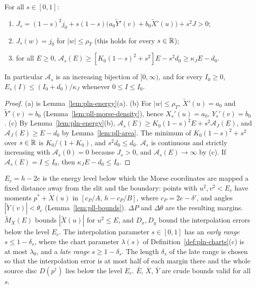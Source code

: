 \begin{lemma}\label{lem:pll-density-area}
For all $s\in[0,1]$:
\begin{enumerate}[label=(\alph*)]
\item $J_s=(1-s)^2j_0+s(1-s)\bigl(a_0\tilde Y'(v)+b_0\tilde X'(u)\bigr)+s^2J>0$;
\item $J_s(w)=j_0$ for $|w|\le\rho_T$ (this holds for every $s\in\mathbb{R}$);
\item for all $E\ge0$, $\mathcal A_s(E)\ge[K_0(1-s)^2+s^2]E-s^2d_0\ge\kappa_JE-d_0$.
\end{enumerate}
In particular $\mathcal A_s$ is an increasing bijection of $[0,\infty)$, and for every $I_0\ge0$,
$E_s(I)\le(I_0+d_0)/\kappa_J$ whenever $0\le I\le I_0$.
\end{lemma}

\begin{proof}
(a) is Lemma~\ref{lem:pln-energy}(a). (b) For $|w|\le\rho_T$, $\tilde X'(u)=a_0$ and $\tilde Y'(v)=b_0$
(Lemma~\ref{lem:pll-morse-density}), hence $X_s'(u)=a_0$, $Y_s'(v)=b_0$. (c) By Lemma~\ref{lem:pln-energy}(b),
$\mathcal A_s(E)\ge K_0(1-s)^2E+s^2\mathcal A_J(E)$, and $\mathcal A_J(E)\ge E-d_0$ by Lemma~\ref{lem:pll-area}. The
minimum of $K_0(1-s)^2+s^2$ over $s\in\mathbb{R}$ is $K_0/(1+K_0)$, and $s^2d_0\le d_0$. $\mathcal A_s$ is continuous and
strictly increasing with $\mathcal A_s(0)=0$ because $J_s>0$, and $\mathcal A_s(E)\to\infty$ by (c). If
$\mathcal A_s(E)=I\le I_0$, then $\kappa_JE-d_0\le I_0$.
\end{proof}

$E_c=h-2e$ is the energy level below which the Morse coordinates are mapped a fixed distance away from the slit and
the boundary: points with $u^2,v^2<E_c$ have moments $p^*+\tilde X(u)$ in $[c_P/A,\,h-c_P/B]$, where
$c_P=2e-\delta'$, and angles $|\tilde Y(v)|<\theta_c$ (Lemma~\ref{lem:pll-bounds}). $\Delta P$ and $\Delta\theta$ are
the resulting margins. $\tilde M_X(E)$ bounds $|\tilde X(u)|$ for $u^2\le E$, and $D_x,D_y$ bound the interpolation
errors below the level $E_c$. The interpolation parameter $s\in[0,1]$ has an \emph{early range} $s\le1-\delta_s$, where
the chart parameter $\lambda(s)$ of Definition~\ref{def:pln-charts}(c) is at most $\lambda_0$, and a \emph{late range}
$s\ge1-\delta_s$. The length $\delta_s$ of the late range is chosen so that the interpolation error is at most half of
each margin there and the whole source disc $D(p^\dagger)$ lies below the level $E_c$. $\bar E$, $\bar X$, $\bar Y$ are
crude bounds valid for all $s$.

